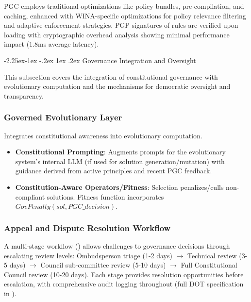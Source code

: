 \documentclass[manuscript,screen,review,anonymous,9pt]{acmart}
\makeatletter
\renewcommand\subsection{\@startsection{subsection}{2}{\z@}%
  {-2.25ex\@plus -1ex \@minus -.2ex}%
  {1ex \@plus .2ex}%
  {\normalfont\large\bfseries}}
\makeatother
\begin{document}
PGC employs traditional optimizations like policy bundles, pre-compilation, and caching, enhanced with WINA-specific optimizations for policy relevance filtering and adaptive enforcement strategies. PGP signatures of rules are verified upon loading with cryptographic overhead analysis showing minimal performance impact (1.8ms average latency).

\subsection{Governance Integration and Oversight}
\label{subsec:governance_integration}

This subsection covers the integration of constitutional governance with evolutionary computation and the mechanisms for democratic oversight and transparency.

\subsubsection{Governed Evolutionary Layer}
Integrates constitutional awareness into evolutionary computation.
\begin{itemize}
    \item \textbf{Constitutional Prompting}: Augments prompts for the evolutionary system's internal LLM (if used for solution generation/mutation) with guidance derived from active principles and recent PGC feedback.
    \item \textbf{Constitution-Aware Operators/Fitness}: Selection penalizes/culls non-compliant solutions. Fitness function incorporates $GovPenalty(sol, PGC\_decision)$.
\end{itemize}

\subsubsection{Appeal and Dispute Resolution Workflow}
A multi-stage workflow () allows challenges to governance decisions through escalating review levels: Ombudsperson triage (1-2 days) $\rightarrow$ Technical review (3-5 days) $\rightarrow$ Council sub-committee review (5-10 days) $\rightarrow$ Full Constitutional Council review (10-20 days). Each stage provides resolution opportunities before escalation, with comprehensive audit logging throughout (full DOT specification in ).
\end{document}
